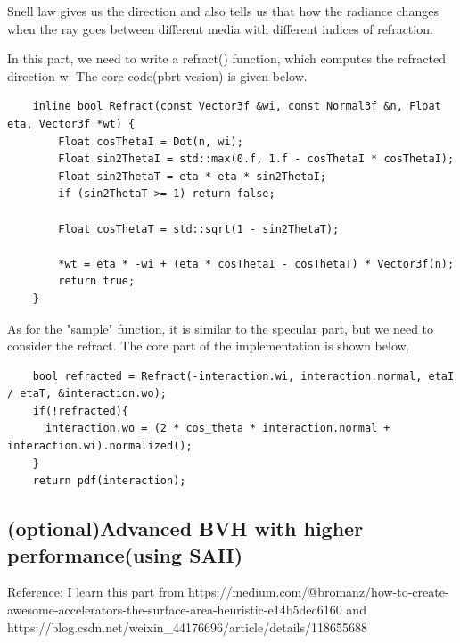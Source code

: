 \documentclass[acmtog]{acmart}
\begin{document}
Snell law gives us the direction and also tells us that how the radiance changes when the ray goes
between different media with different indices of refraction.

In this part, we need to write a refract() function, which computes the refracted direction w. The core code(pbrt vesion) is given below.
\begin{lstlisting}
	inline bool Refract(const Vector3f &wi, const Normal3f &n, Float eta, Vector3f *wt) {
		Float cosThetaI = Dot(n, wi);
		Float sin2ThetaI = std::max(0.f, 1.f - cosThetaI * cosThetaI);
		Float sin2ThetaT = eta * eta * sin2ThetaI;
		if (sin2ThetaT >= 1) return false;

		Float cosThetaT = std::sqrt(1 - sin2ThetaT);

		*wt = eta * -wi + (eta * cosThetaI - cosThetaT) * Vector3f(n);
		return true;
	}
\end{lstlisting}
As for the "sample" function, it is similar to the specular part, but we need to consider the refract. The core part of the implementation is shown below.
\begin{lstlisting}
	bool refracted = Refract(-interaction.wi, interaction.normal, etaI / etaT, &interaction.wo);
	if(!refracted){
	  interaction.wo = (2 * cos_theta * interaction.normal + interaction.wi).normalized();
	}
	return pdf(interaction);
\end{lstlisting}
\subsection{(optional)Advanced BVH with higher performance(using SAH)}
Reference: I learn this part from https://medium.com/@bromanz/how-to-create-awesome-accelerators-the-surface-area-heuristic-e14b5dec6160 
and https://blog.csdn.net/weixin\_44176696/article/details/118655688
\end{document}
